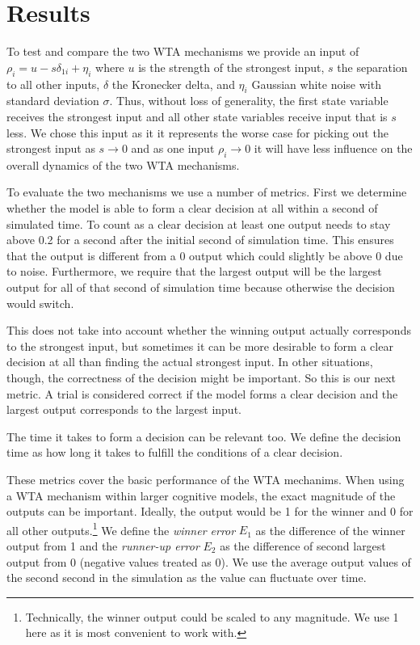 \documentclass[10pt,letterpaper]{article}
\begin{document}
\section{Results}
To test and compare the two WTA mechanisms we provide an input of $\rho_i 
= u - s \delta_{1i} + \eta_i$ where $u$ is the strength of the strongest input, 
$s$ the separation to all other inputs, $\delta$ the Kronecker delta, and 
$\eta_i$ Gaussian white noise with standard deviation $\sigma$. Thus, without 
loss of generality, the first state variable receives the strongest input and 
all other state variables receive input that is $s$ less. We chose this input as 
it it represents the worse case for picking out the strongest input as $s 
\rightarrow 0$ and as one input $\rho_i \rightarrow 0$ it will have less 
influence on the overall dynamics of the two WTA mechanisms.

To evaluate the two mechanisms we use a number of metrics. First we determine 
whether the model is able to form a clear decision at all within a second of 
simulated time. To count as a clear decision at least one output needs to stay 
above 0.2 for a second after the initial second of simulation time. This ensures 
that the output is different from a 0 output which could slightly be above 
0 due to noise. Furthermore, we require that the largest output will be the 
  largest output for all of that second of simulation time because otherwise the 
  decision would switch.

This does not take into account whether the winning output actually corresponds 
to the strongest input, but sometimes it can be more desirable to form a clear 
decision at all than finding the actual strongest input. In other situations, 
though, the correctness of the decision might be important. So this is our next 
metric. A trial is considered correct if the model forms a clear decision and 
the largest output corresponds to the largest input.

The time it takes to form a decision can be relevant too. We define the decision 
time as how long it takes to fulfill the conditions of a clear decision.

These metrics cover the basic performance of the WTA mechanims. When using a WTA 
mechanism within larger cognitive models, the exact magnitude of the outputs can 
be important. Ideally, the output would be 1 for the winner and 0 for all other 
outputs.\footnote{Technically, the winner output could be scaled to any 
    magnitude. We use 1 here as it is most convenient to work with.} We define 
the \emph{winner error} $E_1$ as the difference of the winner output from 1 and 
the \emph{runner-up error} $E_2$ as the difference of second largest output from 
0 (negative values treated as 0). We use the average output values of the second 
  second in the simulation as the value can fluctuate over time.
\end{document}
